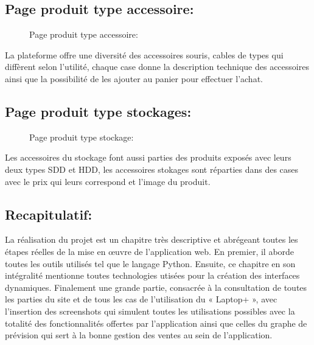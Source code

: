 \documentclass[a4paper]{report}
\begin{document}
\begin{doublespace}
    \subsection{Page produit type accessoire:}
    \begin{figure}[H]
        \begin{center}
            \caption{Page produit type accessoire:}
        \end{center}
    \end{figure}

    La plateforme offre une diversité des accessoires
    souris, cables de types qui diffèrent selon l'utilité, chaque case donne la
    description technique des accessoires ainsi que la possibilité de les ajouter
    au panier pour effectuer l'achat.

    \subsection{Page produit type stockages:}
    \begin{figure}[H]
        \begin{center}
            \caption{Page produit type stockage:}
        \end{center}
    \end{figure}

    Les accessoires du stockage font aussi parties des
    produits exposés avec leurs deux types SDD et HDD, les accessoires stokages
    sont réparties dans des cases avec le prix qui leurs correspond et l'image du
    produit.
    \subsection{Recapitulatif:}
    La réalisation du projet est un chapitre très
    descriptive et abrégeant toutes les étapes réelles de la mise en œuvre de
    l'application web. En premier, il aborde toutes les outils utilisés tel que le
    langage  Python. Ensuite, ce chapitre en son intégralité mentionne toutes
    technologies utisées pour la création des interfaces dynamiques. Finalement une
    grande partie, consacrée à la consultation de toutes les parties du site et de
    tous les cas de l’utilisation du « Laptop+ », avec l’insertion des screenshots
    qui simulent toutes les utilisations possibles avec la totalité des
    fonctionnalités offertes par l'application ainsi que celles du graphe de
    prévision qui sert à la bonne gestion des ventes au sein de l'application.

\end{doublespace}
\end{document}
